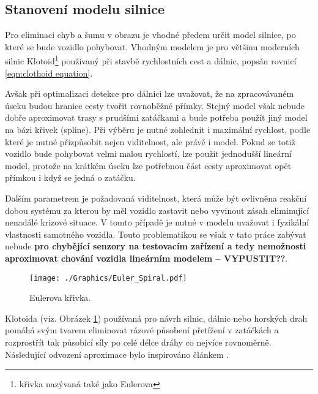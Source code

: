 \documentclass[czech, bc, kky, he, iso690alph]{fasthesis}
\begin{document}
            \subsection{Stanovení modelu silnice}\label{chap:01_stanoveni_modelu_silnice}
                Pro eliminaci chyb a šumu v obrazu je vhodné předem určit model silnice, po které se bude vozidlo pohybovat. Vhodným modelem je pro většinu moderních silnic Klotoid\footnote{křivka nazývaná také jako Eulerova} používaný při stavbě rychlostních cest a dálnic, popsán rovnicí \ref{eqn:clothoid equation}.
                
                Avšak při optimalizaci detekce pro dálnici lze uvažovat, že na zpracovávaném úseku budou hranice cesty tvořit rovnoběžné přímky. Stejný model však nebude dobře aproximovat trasy s prudšími zatáčkami a bude potřeba použít jiný model na bázi křivek (spline). Při výběru je nutné zohlednit i maximální rychlost, podle které je nutné přizpůsobit nejen viditelnost, ale právě i model. Pokud se totiž vozidlo bude pohybovat velmi malou rychlostí, lze použít jednodušší lineární model, protože na krátkém úseku lze potřebnou část cesty aproximovat opět přímkou i když se jedná o zatáčku.
                
                Dalším parametrem je požadovaná viditelnost, která může být ovlivněna reakční dobou systému za kterou by měl vozidlo zastavit nebo vyvinout zásah eliminující nenadálé krizové situace. V tomto případě je nutné v modelu uvažovat i fyzikální vlastnosti samotného vozidla. Touto problematikou se však v tato práce zabývat nebude \textbf{pro chybějící senzory na testovacím zařízení a tedy nemožnosti aproximovat chování vozidla lineárním modelem -- VYPUSTIT??}.
                
                	\begin{figure}[h]
                		\centering
                		\texttt{[image: ./Graphics/Euler\_Spiral.pdf]}
                		\caption{Eulerova křivka.}
                		\label{pic:Eulerova_krivka}
                	\end{figure}
                
                Klotoida (viz. Obrázek \ref{pic:Eulerova_krivka}) používaná pro návrh silnic, dálnic nebo horských drah pomáhá svým tvarem eliminovat rázové působení přetížení v zatáčkách a rozprostřít tak působící síly po celé délce dráhy co nejvíce rovnoměrně. Následující odvození aproximace bylo inspirováno článkem \cite{eliou_kaliabetsos_2013}.
                
\end{document}
